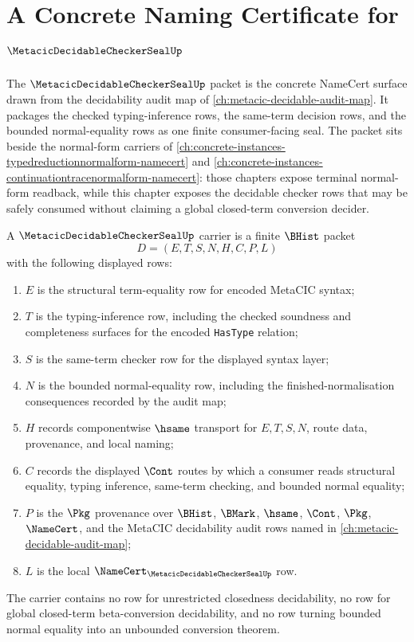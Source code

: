 \chapter{A Concrete Naming Certificate for $\MetacicDecidableCheckerSealUp$}
\label{ch:concrete-instances-metacicdecidablecheckerseal-namecert}

The $\MetacicDecidableCheckerSealUp$ packet is the concrete NameCert surface drawn from the decidability audit map of \autoref{ch:metacic-decidable-audit-map}. It packages the checked typing-inference rows, the same-term decision rows, and the bounded normal-equality rows as one finite consumer-facing seal. The packet sits beside the normal-form carriers of \autoref{ch:concrete-instances-typedreductionnormalform-namecert} and \autoref{ch:concrete-instances-continuationtracenormalform-namecert}: those chapters expose terminal normal-form readback, while this chapter exposes the decidable checker rows that may be safely consumed without claiming a global closed-term conversion decider.

\begin{definition}
\label{def:metacic-decidable-checker-seal-carrier}
A $\MetacicDecidableCheckerSealUp$ carrier is a finite $\BHist$ packet
$$
D=(E,T,S,N,H,C,P,L)
$$
with the following displayed rows:
\begin{enumerate}
\item $E$ is the structural term-equality row for encoded MetaCIC syntax;
\item $T$ is the typing-inference row, including the checked soundness and completeness surfaces for the encoded \texttt{HasType} relation;
\item $S$ is the same-term checker row for the displayed syntax layer;
\item $N$ is the bounded normal-equality row, including the finished-normalisation consequences recorded by the audit map;
\item $H$ records componentwise $\hsame$ transport for $E,T,S,N$, route data, provenance, and local naming;
\item $C$ records the displayed $\Cont$ routes by which a consumer reads structural equality, typing inference, same-term checking, and bounded normal equality;
\item $P$ is the $\Pkg$ provenance over $\BHist$, $\BMark$, $\hsame$, $\Cont$, $\Pkg$, $\NameCert$, and the MetaCIC decidability audit rows named in \autoref{ch:metacic-decidable-audit-map};
\item $L$ is the local $\NameCert_{\MetacicDecidableCheckerSealUp}$ row.
\end{enumerate}
The carrier contains no row for unrestricted closedness decidability, no row for global closed-term beta-conversion decidability, and no row turning bounded normal equality into an unbounded conversion theorem.
\end{definition}

